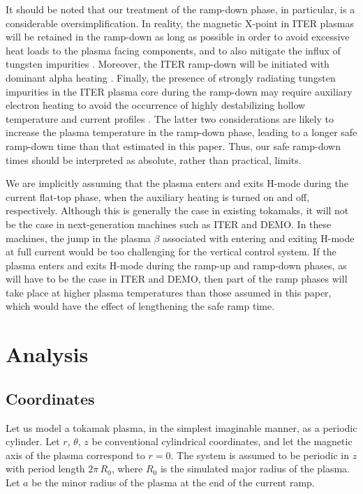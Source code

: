 \documentclass{iopjournal}
\begin{document}
It should be noted that our treatment of the ramp-down phase, in particular, is a considerable oversimplification. In reality,
the magnetic X-point in ITER plasmas will be retained in the ramp-down as long as possible in order to avoid excessive heat loads to the
plasma facing components, and to also mitigate the influx of tungsten impurities \cite{poli}. Moreover, the ITER ramp-down will be initiated with
dominant alpha heating \cite{deVries}. Finally, the presence of strongly radiating tungsten impurities in the ITER plasma core during the ramp-down may require auxiliary
electron heating to avoid the occurrence of  highly destabilizing hollow temperature and current profiles \cite{w1,w2}. The latter two considerations
are likely to increase the plasma temperature in the ramp-down phase, leading to a longer safe ramp-down time than that estimated in this paper. Thus,
our safe ramp-down times should be interpreted as absolute, rather than practical, limits. 

We are implicitly assuming that the plasma enters and exits H-mode during the current flat-top phase,  when the auxiliary heating is turned on and off, respectively.
Although this is generally the case in existing tokamaks, it will not be the case in next-generation machines such as ITER and DEMO. In these machines,   the
jump in the plasma $\beta$ associated with entering and exiting H-mode at full current would be too challenging for the vertical control system. 
If the plasma enters and exits H-mode during the ramp-up and ramp-down phases, as will have to be the case in ITER and DEMO, then part of the ramp phases will take place at higher plasma
temperatures than those assumed in this paper, which would have the effect of lengthening the safe ramp  time.  

\section{Analysis}
\subsection{Coordinates}
Let us model a tokamak plasma, in the simplest imaginable manner, as a periodic cylinder. Let $r$, $\theta$, $z$ be conventional cylindrical coordinates, and
let the magnetic axis of the plasma correspond to $r=0$. The system is assumed to be periodic in $z$ with period length $2\pi\,R_0$, where $R_0$ is the
simulated major radius of the plasma. Let $a$ be the minor radius of the plasma at the end of the current ramp. 
\end{document}

